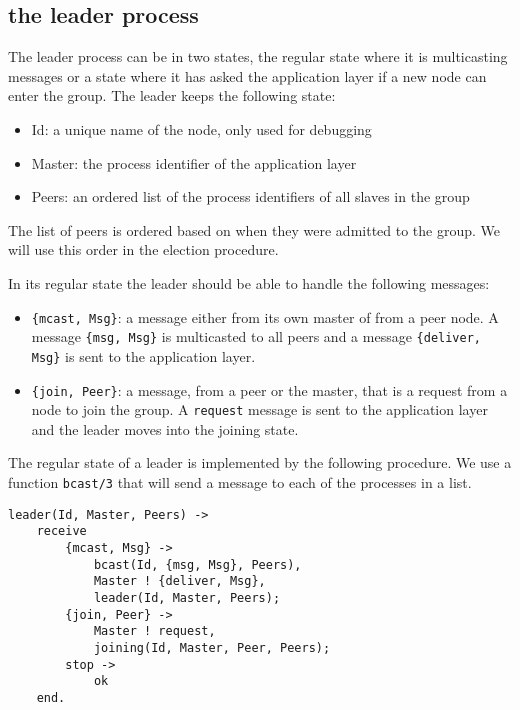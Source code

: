 \documentclass[a4paper,11pt]{article}
\begin{document}
\subsection{the leader process}

The leader process can be in two states, the regular state where it is
multicasting messages or a state where it has asked the application
layer if a new node can enter the group. The leader keeps the
following state:

\begin{itemize}
\item Id: a unique name of the node, only used for debugging
\item Master: the process identifier of the application layer
\item Peers: an ordered list of the process identifiers of all slaves in the group
\end{itemize}

The list of peers is ordered based on when they were admitted to the
group. We will use this order in the election procedure.

In its regular state the leader should be able to handle the following
messages:

\begin{itemize}
\item {\tt\{mcast, Msg\}}: a message either from its own master of
  from a peer node. A message {\tt\{msg, Msg\}} is multicasted to all
  peers and a message {\tt\{deliver, Msg\}} is sent to the application
  layer.
\item {\tt \{join, Peer\}}: a message, from a peer or the master, that
  is a request from a node to join the group. A {\tt request} message
  is sent to the application layer and the leader moves into the
  joining state.
\end{itemize}

The regular state of a leader is implemented by the following
procedure. We use a function {\tt bcast/3} that will send a message to
each of the processes in a list.

\begin{verbatim}
leader(Id, Master, Peers) ->    
    receive
        {mcast, Msg} ->
            bcast(Id, {msg, Msg}, Peers),
            Master ! {deliver, Msg},
            leader(Id, Master, Peers);
        {join, Peer} ->
            Master ! request,
            joining(Id, Master, Peer, Peers);
        stop ->
            ok
    end.
\end{verbatim}
\end{document}
